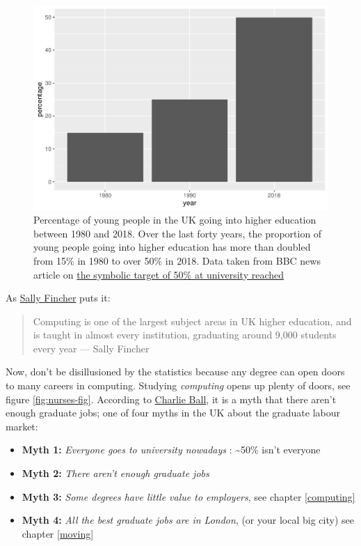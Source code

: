 \documentclass[
]{book}
\providecommand{\tightlist}{%
  \setlength{\itemsep}{0pt}\setlength{\parskip}{0pt}}
\begin{document}
\begin{figure}

{\centering \includegraphics[width=1\linewidth]{cdyf_files/figure-latex/lotsofgrads-fig-1} 

}

\caption{Percentage of young people in the UK going into higher education between 1980 and 2018. Over the last forty years, the proportion of young people going into higher education has more than doubled from 15\% in 1980 to over 50\% in 2018. Data taken from BBC news article on \href{https://www.bbc.co.uk/news/education-49841620}{the symbolic target of 50\% at university reached} \citep{lotsofgrads}}\label{fig:lotsofgrads-fig}
\end{figure}



As \href{https://en.wikipedia.org/wiki/Sally_Fincher}{Sally Fincher} puts it:

\begin{quote}
Computing is one of the largest subject areas in UK higher education, and is taught in almost every institution, graduating around 9,000 students every year
\hfill --- Sally Fincher \citep{fincherreview}
\end{quote}

Now, don't be disillusioned by the statistics because any degree can open doors to many careers in computing. Studying \emph{computing} opens up plenty of doors, see figure \ref{fig:nurses-fig}. According to \href{https://twitter.com/lmicharlie}{Charlie Ball}, it is a myth that there aren't enough graduate jobs; one of four myths in the UK about the graduate labour market:

\begin{itemize}
\tightlist
\item
  \textbf{Myth 1:} \emph{Everyone goes to university nowadays} : \textasciitilde50\% isn't everyone \citep{ballmyths}
\item
  \textbf{Myth 2:} \emph{There aren't enough graduate jobs} \citep{ballmyths}
\item
  \textbf{Myth 3:} \emph{Some degrees have little value to employers}, see chapter \ref{computing}
\item
  \textbf{Myth 4:} \emph{All the best graduate jobs are in London}, (or your local big city) see chapter \ref{moving}
\end{itemize}
\end{document}
